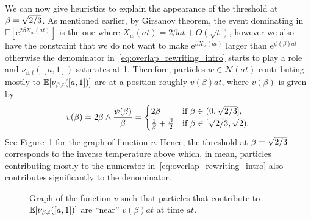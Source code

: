 \documentclass[10pt]{amsart}
\theoremstyle{definition}\newtheorem{defi}[theo]{Definition}\newtheorem{rema}[theo]{Remark}\newtheorem{exam}[theo]{Example}\newtheorem{exem}[theo]{Example}\newtheorem{nota}[theo]{Notation}
\newcommand{\e}{\mathrm{e}}
\newcommand{\E}{\mathbb{E}}
\newcommand\1{\mathds{1}}
\newcommand{\cN}{\mathcal{N}}
\newcommand{\Expec}[1]{\mathbb{E}\left[#1\right]}
\let\originalleft\left
\let\originalright\right
\renewcommand{\left}{\mathopen{}\mathclose\bgroup\originalleft}
\renewcommand{\right}{\aftergroup\egroup\originalright}
\begin{document}
We can now give heuristics to explain the appearance of the threshold at $\beta = \sqrt{2\smash{/}3}$. As mentioned earlier, by Girsanov theorem, the event dominating in $\E[\e^{2\beta X_w(at)}]$ is the one where $X_w(at) = 2\beta at + O(\sqrt{t})$, however we also have the constraint that we do not want to make $\e^{\beta X_w(at)}$ larger than $\e^{\psi(\beta)at}$ otherwise the denominator in~\eqref{eq:overlap_rewriting_intro} starts to play a role and $\nu_{\beta, t}([a, 1])$ saturates at 1. Therefore, particles $w\in \cN(at)$ contributing mostly to $\Expec{\nu_{\beta, t}([a, 1])}$ are at a position roughly $v(\beta) at$, where $v(\beta)$ is given by
\begin{equation}
v(\beta) = 2\beta \wedge \frac{\psi(\beta)}{\beta} =
\begin{cases}
2 \beta & \text{if } \beta \in (0,\sqrt{2\smash{/}3}], \\
\frac{1}{\beta} + \frac{\beta}{2} & \text{if } \beta \in [\sqrt{2\smash{/}3}, \sqrt{2}).
\end{cases}
\end{equation}
See Figure~\ref{fig:v(beta)} for the graph of function $v$. Hence, the threshold at $\beta = \sqrt{2\smash{/}3}$ corresponds to the inverse temperature above which, in mean, particles contributing mostly to the numerator in~\eqref{eq:overlap_rewriting_intro} also contributes significantly to the denominator.

\begin{figure}[!h]
\centering
{}
\caption{Graph of the function $v$ such that particles that contribute to $\Expec{\nu_{\beta, t}([a, 1])}$ are ``near'' $v(\beta)at$ at time $at$.}\label{fig:v(beta)}
\end{figure}
\end{document}
